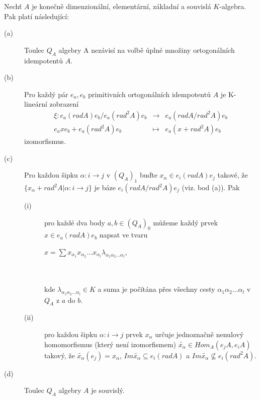     \begin{lem}\label{lem-velke-algebra-repre}
      Nechť $A$ je konečně dimenzionální, elementární, základní a souvislá $K$-algebra. Pak platí 
      následující:
      \begin{description}
        \item[(a)] Toulec $Q_A$ algebry A nezávisí na volbě úplné množiny
          ortogonálních idempotentů $A$.
        \item[(b)] Pro každý pár $e_a,e_b$ primitivních ortogonálních 
          idempotentů $A$ je K-lineární zobrazení 
          \begin{eqnarray}
            \xi: e_a(radA)e_b/e_a(rad^2A)e_b &\to& e_a(radA/rad^2A)e_b \nonumber \\
            e_axe_b+e_a(rad^2A)e_b &\mapsto& e_a(x+rad^2A)e_b \nonumber
          \end{eqnarray}
          izomorfismus.
        \item[(c)] Pro každou šipku $\alpha:i\rightarrow j$ v $(Q_A)_1$ buďte $x_\alpha\in e_i(radA)e_j$
         takové, že $\{x_\alpha+rad^2 A|\alpha:i\rightarrow j\}$ je báze $e_i(radA/rad^2A)e_j$ 
         (viz. bod (a)). Pak           
          \begin{description}
            \item[(i)] pro každé dva body $a,b\in(Q_A)_0$ můžeme každý prvek $x\in e_a(radA)e_b$ 
            napsat ve tvaru \\
            \centerline{$x=\sum x_{\alpha_1}x_{\alpha_2}\ldots 
            x_{\alpha_l}\lambda_{\alpha_1\alpha_2\ldots\alpha_l}$,}\\\\
            kde $\lambda_{\alpha_1\alpha_2\ldots\alpha_l}\in K$ a suma je 
            počítána přes všechny cesty $\alpha_1\alpha_2\ldots\alpha_l$ v $Q_A$ 
            z $a$ do $b$.
            \item[(ii)] pro každou šipku $\alpha:i\rightarrow j$ prvek $x_\alpha$ 
            určuje jednoznačně nenulový homomorfismus (který není izomorfismem) 
            $\tilde{x_\alpha}\in Hom_A(e_jA,e_iA)$ takový, že 
            $\tilde{x_\alpha}(e_j)=x_\alpha$, $Im\tilde{x_\alpha}\subseteq e_i(radA)$ 
            a $Im\tilde{x_\alpha}\not\subseteq e_i(rad^2A)$. 
          \end{description}
        \item[(d)] Toulec $Q_A$ algebry $A$ je souvislý. 
      \end{description}
    \end{lem}
    
